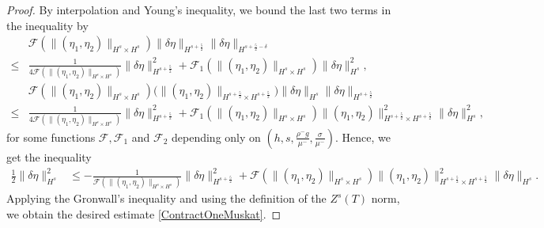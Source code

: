 \documentclass[10pt,a4paper]{amsart}
\newcommand{\f}{\frac}
\begin{document}
\begin{proof}
By interpolation and Young's inequality, we bound the last two terms in the inequality by 
\begin{align*}
&\mathcal{F}(\|(\eta_1, \eta_2)\|_{H^s\times H^s}) \|\delta \eta\|_{H^{s+\f52}} \|\delta \eta\|_{H^{s+\f52-\delta}} \\
\leq& \f{1}{4\mathcal{F}(\|(\eta_1, \eta_2)\|_{H^s\times H^s})} \|\delta \eta \|^2_{H^{s+\f52}} + \mathcal{F}_1(\|(\eta_1, \eta_2)\|_{H^s\times H^s}) \|\delta \eta\|^2_{H^s}, \\
& \mathcal{F}(\|(\eta_1, \eta_2)\|_{H^s\times H^s}) \Big(\|(\eta_1, \eta_2)\|_{H^{s+\f52}\times H^{s+\f52}}\Big)  \|\delta \eta\|_{H^s} \|\delta \eta\|_{H^{s+\f52}} \\
\leq& \f{1}{4\mathcal{F}(\|(\eta_1, \eta_2)\|_{H^s\times H^s})} \|\delta \eta \|^2_{H^{s+\f52}} + \mathcal{F}_1(\|(\eta_1, \eta_2)\|_{H^s\times H^s}) \|(\eta_1, \eta_2)\|_{H^{s+\f52}\times H^{s+\f52}}^2 \|\delta \eta\|^2_{H^s},
\end{align*}
for some functions $\mathcal{F}, \mathcal{F}_1$ and $\mathcal{F}_2$ depending only on $(h,s,\frac{\rho^- g}{\mu^-},\frac{\sigma}{\mu^-})$.
Hence, we get the inequality 
\begin{align*}
\f12 \|\delta \eta \|^2_{H^s} &\leq - \f{1}{\mathcal{F}(\|(\eta_1, \eta_2)\|_{H^s\times H^s})} \|\delta \eta \|^2_{H^{s+\f52}} + \mathcal{F}(\|(\eta_1, \eta_2)\|_{H^s\times H^s}) \|(\eta_1, \eta_2)\|_{H^{s+\f52}\times H^{s+\f52}}^2  \|\delta \eta\|_{H^s}.
\end{align*}
Applying the Gronwall's inequality and using the definition of the $Z^s(T)$ norm, we obtain the desired estimate \eqref{ContractOneMuskat}.
\end{proof}
\end{document}
